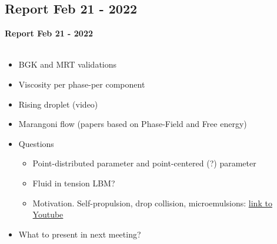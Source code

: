 \documentclass{beamer}
\begin{document}
	\subsection{Report Feb 21 - 2022}
	\label{}
	\justifying
	\begin{frame}
		\textbf{Report Feb 21 - 2022}\\~\\
		\begin{itemize}
			\item BGK and MRT validations
			\item Viscosity per phase-per component
			\item Rising droplet (video)
			\item Marangoni flow (papers based on Phase-Field and Free energy)
			\item Questions
			\begin{itemize}
				\item Point-distributed parameter and point-centered (?) parameter
				\item Fluid in tension LBM?
				\item Motivation. Self-propulsion, drop collision, microemulsions: \href{https://www.youtube.com/watch?v=arpGntfrg4s}{link to Youtube}
			\end{itemize}
			\item What to present in next meeting?
		\end{itemize}
	\end{frame}
\end{document}
